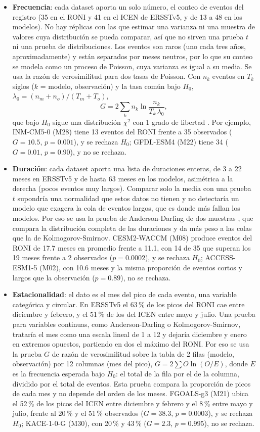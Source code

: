 \documentclass[11pt,a4paper]{article}
\begin{document}
\begin{itemize}[nosep]
\item \textbf{Frecuencia}: cada dataset aporta un solo número, el conteo de eventos del registro (35 en el RONI y 41 en el ICEN de ERSSTv5, y de 13 a 48 en los modelos). No hay réplicas con las que estimar una varianza ni una muestra de valores cuya distribución se pueda comparar, así que no sirven una prueba $t$ ni una prueba de distribuciones. Los eventos son raros (uno cada tres años, aproximadamente) y están separados por meses neutros, por lo que su conteo se modela como un proceso de Poisson, cuya varianza es igual a su media. Se usa la razón de verosimilitud para dos tasas de Poisson. Con $n_k$ eventos en $T_k$ siglos ($k$ = modelo, observación) y la tasa común bajo $H_0$, $\lambda_0 = (n_m+n_o)/(T_m+T_o)$,
\begin{equation}
\label{eq:lrt}
G = 2\sum_{k} n_k \ln\frac{n_k}{T_k\,\lambda_0},
\end{equation}
que bajo $H_0$ sigue una distribución $\chi^2$ con 1 grado de libertad \citep{wilks1938}. Por ejemplo, INM-CM5-0 (M28) tiene 13 eventos del RONI frente a 35 observados ($G = 10.5$, $p = 0.001$), y se rechaza $H_0$; GFDL-ESM4 (M22) tiene 34 ($G = 0.01$, $p = 0.90$), y no se rechaza.
\item \textbf{Duración}: cada dataset aporta una lista de duraciones enteras, de 3 a 22 meses en ERSSTv5 y de hasta 63 meses en los modelos, asimétrica a la derecha (pocos eventos muy largos). Comparar solo la media con una prueba $t$ supondría una normalidad que estos datos no tienen y no detectaría un modelo que exagera la cola de eventos largos, que es donde más fallan los modelos. Por eso se usa la prueba de Anderson-Darling de dos muestras \citep{scholz1987}, que compara la distribución completa de las duraciones y da más peso a las colas que la de Kolmogorov-Smirnov. CESM2-WACCM (M08) produce eventos del RONI de 17.7 meses en promedio frente a 11.1, con 14 de 35 que superan los 19 meses frente a 2 observados ($p = 0.0002$), y se rechaza $H_0$; ACCESS-ESM1-5 (M02), con 10.6 meses y la misma proporción de eventos cortos y largos que la observación ($p = 0.89$), no se rechaza.
\item \textbf{Estacionalidad}: el dato es el mes del pico de cada evento, una variable categórica y circular. En ERSSTv5 el 63\,\% de los picos del RONI cae entre diciembre y febrero, y el 51\,\% de los del ICEN entre mayo y julio. Una prueba para variables continuas, como Anderson-Darling o Kolmogorov-Smirnov, trataría el mes como una escala lineal de 1 a 12 y dejaría diciembre y enero en extremos opuestos, partiendo en dos el máximo del RONI. Por eso se usa la prueba $G$ de razón de verosimilitud sobre la tabla de 2 filas (modelo, observación) por 12 columnas (mes del pico), $G = 2\sum O \ln(O/E)$, donde $E$ es la frecuencia esperada bajo $H_0$: el total de la fila por el de la columna, dividido por el total de eventos. Esta prueba compara la proporción de picos de cada mes y no depende del orden de los meses. FGOALS-g3 (M21) ubica el 52\,\% de los picos del ICEN entre diciembre y febrero y el 8\,\% entre mayo y julio, frente al 20\,\% y el 51\,\% observados ($G = 38.3$, $p = 0.0003$), y se rechaza $H_0$; KACE-1-0-G (M30), con 20\,\% y 43\,\% ($G = 2.3$, $p = 0.995$), no se rechaza.

\end{itemize}
\end{document}

